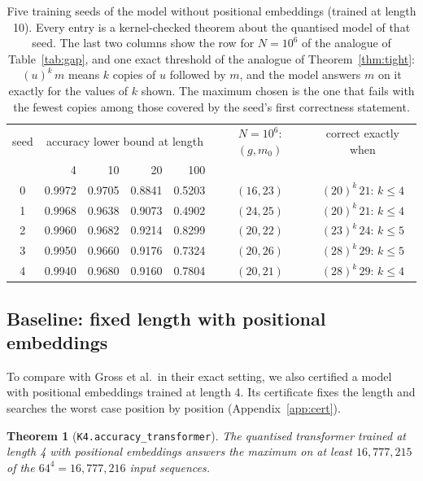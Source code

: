 \documentclass[11pt,a4paper]{article}
\newtheorem{theorem}{Theorem}
\newcommand{\lean}[1]{\texttt{#1}}
\begin{document}
\begin{table}[ht]
\centering
\begin{tabular}{crrrrcc}
\toprule
seed & \multicolumn{4}{c}{accuracy lower bound at length} & $N=10^6$: $(g,m_0)$ & correct exactly when\\
 & 4 & 10 & 20 & 100 & & \\
\midrule
0 & 0.9972 & 0.9705 & 0.8841 & 0.5203 & $(16,23)$ & $(20)^k\,21$: $k\le4$\\
1 & 0.9968 & 0.9638 & 0.9073 & 0.4902 & $(24,25)$ & $(20)^k\,21$: $k\le4$\\
2 & 0.9960 & 0.9682 & 0.9214 & 0.8299 & $(20,22)$ & $(23)^k\,24$: $k\le5$\\
3 & 0.9950 & 0.9660 & 0.9176 & 0.7324 & $(20,26)$ & $(28)^k\,29$: $k\le5$\\
4 & 0.9940 & 0.9680 & 0.9160 & 0.7804 & $(20,21)$ & $(28)^k\,29$: $k\le4$\\
\bottomrule
\end{tabular}
\caption{Five training seeds of the model without positional embeddings
(trained at length 10). Every entry is a kernel-checked theorem about the
quantised model of that seed. The last two columns show the row for $N=10^6$ of
the analogue of Table~\ref{tab:gap}, and one exact threshold of the analogue
of Theorem~\ref{thm:tight}: $(u)^k\,m$ means $k$ copies of $u$ followed by
$m$, and the model answers $m$ on it exactly for the values of $k$ shown. The
maximum chosen is the one that fails with the fewest copies among those covered
by the seed's first correctness statement.}\label{tab:seeds}
\end{table}

\subsection{Baseline: fixed length with positional embeddings}

To compare with Gross et al.\ in their exact setting, we also certified a model
with positional embeddings trained at length 4. Its certificate fixes the
length and searches the worst case position by position
(Appendix~\ref{app:cert}).

\begin{theorem}[\lean{K4.accuracy\_transformer}]\label{thm:k4}
The quantised transformer trained at length 4 with positional embeddings answers
the maximum on at least $16{,}777{,}215$ of the $64^4=16{,}777{,}216$ input
sequences.
\end{theorem}
\end{document}
